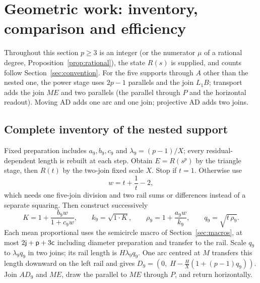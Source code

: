 \section{Geometric work: inventory, comparison and efficiency}\label{sec:work}

Throughout this section $p\ge3$ is an integer (or the numerator $\mu$ of a rational degree,
Proposition~\ref{prop:rational}), the state $R(s)$ is supplied, and counts follow
Section~\ref{sec:convention}. For the five supports through $A$ other than the nested one, the power
stage uses $2p-1$ parallels and the join $L_1B$; transport adds the join $ME$ and two parallels (the
parallel through $P$ and the horizontal readout). Moving AD adds one arc and one join; projective AD
adds two joins.

\subsection{Complete inventory of the nested support}

Fixed preparation includes $a_9,b_9,c_9$ and $\lambda_9=(p-1)/X$; every residual-dependent length is
rebuilt at each step. Obtain $E=R(s^{p})$ by the triangle stage, then $R(t)$ by the two-join fixed scale
$X$. Stop if $t=1$. Otherwise use
\begin{equation}\label{eq:w}
w=t+\frac1t-2,
\end{equation}
which needs one five-join division and two rail sums or differences instead of a separate squaring.
Then construct successively
\[ K=1+\frac{b_9w}{1+c_9w},\qquad k_9=\sqrt{1\cdot K},\qquad \rho_9=1+\frac{a_9w}{k_9},\qquad
q_9=\sqrt{t\,\rho_9}. \]
Each mean proportional uses the semicircle macro of Section~\ref{sec:macros}, at most
$2\mathsf{j}+\mathsf{p}+3\mathsf{c}$ including diameter preparation and transfer to the rail. Scale $q_9$ to $\lambda_9q_9$
in two joins; its rail length is $H\lambda_9q_9$. One arc centred at $M$ transfers this length
downward on the left rail and gives $D_9=(0,\;H-\tfrac HX(1+(p-1)q_9))$. Join $AD_9$ and $ME$, draw the
parallel to $ME$ through $P$, and return horizontally.

